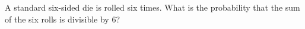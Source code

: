 A standard six-sided die is rolled six times. What is the probability that the sum of the six rolls is divisible by $6$?
